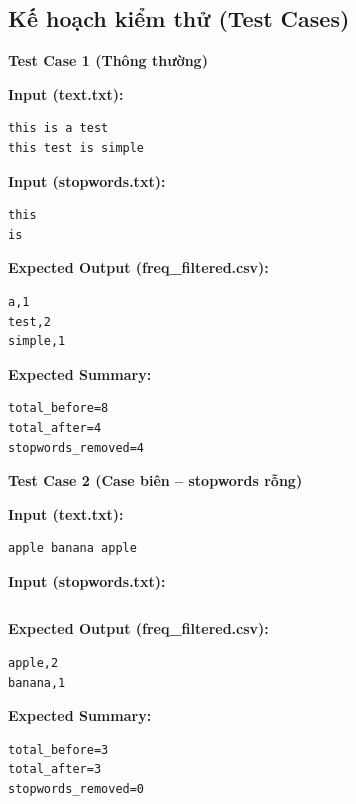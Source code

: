 \subsection{Kế hoạch kiểm thử (Test Cases)}

\textbf{Test Case 1 (Thông thường)}

\textbf{Input (text.txt):}

\begin{lstlisting}
this is a test
this test is simple
\end{lstlisting}

\textbf{Input (stopwords.txt):}

\begin{lstlisting}
this
is
\end{lstlisting}

\textbf{Expected Output (freq\_filtered.csv):}

\begin{lstlisting}
a,1
test,2
simple,1
\end{lstlisting}

\textbf{Expected Summary:}

\begin{lstlisting}
total_before=8
total_after=4
stopwords_removed=4
\end{lstlisting}

\vspace{0.5cm}

\textbf{Test Case 2 (Case biên -- stopwords rỗng)}

\textbf{Input (text.txt):}

\begin{lstlisting}
apple banana apple
\end{lstlisting}

\textbf{Input (stopwords.txt):}

\begin{lstlisting}

\end{lstlisting}

\textbf{Expected Output (freq\_filtered.csv):}

\begin{lstlisting}
apple,2
banana,1
\end{lstlisting}

\textbf{Expected Summary:}

\begin{lstlisting}
total_before=3
total_after=3
stopwords_removed=0
\end{lstlisting}

\vspace{0.5cm}


